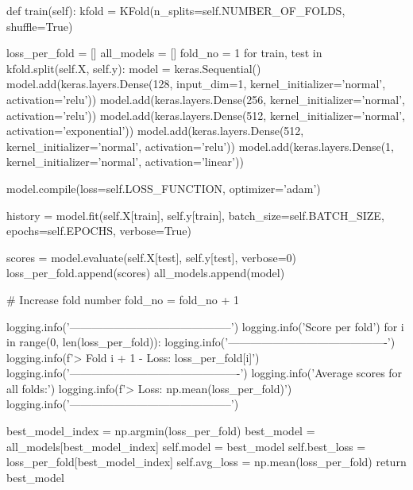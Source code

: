 \documentclass[12pt,titlepage,a4page , tikz , multi,table , svgnames,xcdraw]{article}
\begin{document}
\begin{latin}
\begin{python}[language=Python]
def train(self):
        kfold = KFold(n_splits=self.NUMBER_OF_FOLDS, shuffle=True)

        loss_per_fold = []
        all_models = []
        fold_no = 1
        for train, test in kfold.split(self.X, self.y):
            model = keras.Sequential()
            model.add(keras.layers.Dense(128, input_dim=1,
             kernel_initializer='normal', activation='relu'))
            model.add(keras.layers.Dense(256,
             kernel_initializer='normal',
             activation='relu'))
            model.add(keras.layers.Dense(512,
             kernel_initializer='normal', activation='exponential'))
            model.add(keras.layers.Dense(512,
             kernel_initializer='normal',
             activation='relu'))
            model.add(keras.layers.Dense(1,
             kernel_initializer='normal',
             activation='linear'))

            model.compile(loss=self.LOSS_FUNCTION, optimizer='adam')

            history = model.fit(self.X[train], self.y[train],
                                batch_size=self.BATCH_SIZE,
                                epochs=self.EPOCHS,
                                verbose=True)

            scores = model.evaluate(self.X[test],
             self.y[test], verbose=0)
            loss_per_fold.append(scores)
            all_models.append(model)

            # Increase fold number
            fold_no = fold_no + 1

        logging.info('--------------------------------------------')
        logging.info('Score per fold')
        for i in range(0, len(loss_per_fold)):
            logging.info('-------------------------------------------')
            logging.info(f'> Fold {i + 1} - Loss: {loss_per_fold[i]}')
        logging.info('----------------------------------------------')
        logging.info('Average scores for all folds:')
        logging.info(f'> Loss: {np.mean(loss_per_fold)}')
        logging.info('--------------------------------------------')

        best_model_index = np.argmin(loss_per_fold)
        best_model = all_models[best_model_index]
        self.model = best_model
        self.best_loss = loss_per_fold[best_model_index]
        self.avg_loss = np.mean(loss_per_fold)
        return best_model
\end{python}

\end{latin}
\end{document}
